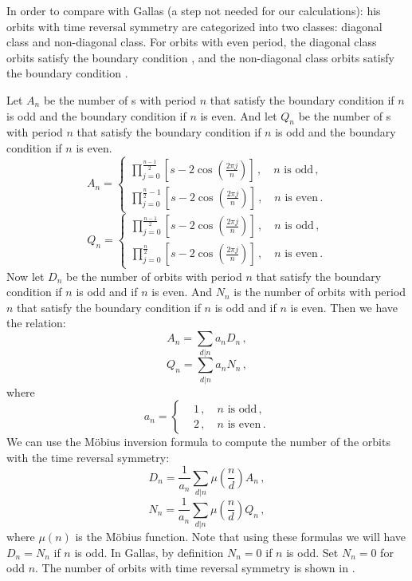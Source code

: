 \begin{description}
In order to compare with Gallas (a step not needed
for our calculations):
his orbits with time reversal symmetry are categorized into two classes:
diagonal class and non-diagonal class. For orbits with even period, the
diagonal class orbits satisfy the boundary condition
, and the non-diagonal class orbits
satisfy the boundary condition .

Let $A_n$ be the number of {\lattstate}s with period $n$
that satisfy the boundary condition  if
$n$ is odd and the boundary condition  if
$n$ is even.
And let $Q_n$ be the number of {\lattstate}s with period $n$
that satisfy the boundary condition  if
$n$ is odd and the boundary condition  if
$n$ is even.
\[
A_n =
\left\{
\begin{aligned}
\prod_{j=0}^{\frac{n-1}{2}} \left[s-2\cos\left(\frac{2 \pi j}{n}\right)\right]\,,
\quad \text{$n$ is odd}
 \,,\\
\prod_{j=0}^{\frac{n}{2}-1} \left[s-2\cos\left(\frac{2 \pi j}{n}\right)\right]\,,
\quad \text{$n$ is even}
  \,.
 \end{aligned}\right.
\]
\[
Q_n =
\left\{
\begin{aligned}
\prod_{j=0}^{\frac{n-1}{2}} \left[s-2\cos\left(\frac{2 \pi j}{n}\right)\right]\,,
\quad \text{$n$ is odd}
 \,,\\
\prod_{j=0}^{\frac{n}{2}} \left[s-2\cos\left(\frac{2 \pi j}{n}\right)\right]\,,
\quad \text{$n$ is even}
  \,.
 \end{aligned}\right.
\]
Now let $D_n$ be the number of orbits with period $n$ that satisfy the boundary
condition  if $n$ is odd and
 if $n$ is even.
And $N_n$ is the number of orbits with period $n$ that satisfy the boundary
condition  if $n$ is odd and
 if $n$ is even.
Then we have the relation:
\[
A_n = \sum_{d|n} a_n D_n \,,
\]
\[
Q_n = \sum_{d|n} a_n N_n \,,
\]
where
\[
a_n =
\left\{
\begin{aligned}
&1\,,
\quad \text{$n$ is odd}
 \,,\\
&2\,,
\quad \text{$n$ is even}
  \,.
 \end{aligned}\right.
\]
We can use the M\"{o}bius inversion formula to compute the number of the orbits
with the time reversal symmetry:
\[
D_n = \frac{1}{a_n} \sum_{d|n}\mu\left(\frac{n}{d}\right) A_n \,,
\]
\[
N_n = \frac{1}{a_n} \sum_{d|n}\mu\left(\frac{n}{d}\right) Q_n \,,
\]
where $\mu(n)$ is the M\"{o}bius function.
Note that using these formulas we will have $D_n=N_n$ if $n$ is odd. In
Gallas, by definition $N_n=0$ if $n$ is odd.
Set $N_n = 0$ for odd $n$. The number of orbits with time reversal symmetry
is shown in .



\end{description}

